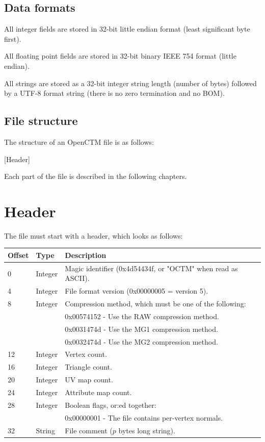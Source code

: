 \section{Data formats}
All integer fields are stored in 32-bit little endian format (least significant
byte first).

All floating point fields are stored in 32-bit binary IEEE 754 format (little
endian).

All strings are stored as a 32-bit integer string length (number of bytes)
followed by a UTF-8 format string (there is no zero termination and no BOM).

\section{File structure}
The structure of an OpenCTM file is as follows:

[Header]

Each part of the file is described in the following chapters.



\chapter{Header}
The file must start with a header, which looks as follows:

\begin{tabular}{|l|l|l|}\hline
\textbf{Offset} &  \textbf{Type} & \textbf{Description}\\ \hline
0 & Integer & Magic identifier (0x4d54434f, or "OCTM" when read as ASCII).\\ \hline
4 & Integer & File format version (0x00000005 = version 5).\\ \hline
8 & Integer & Compression method, which must be one of the following:\\
 & & 0x00574152 - Use the RAW compression method.\\
 & & 0x0031474d - Use the MG1 compression method.\\
 & & 0x0032474d - Use the MG2 compression method.\\ \hline
12 & Integer & Vertex count.\\ \hline
16 & Integer & Triangle count.\\ \hline
20 & Integer & UV map count.\\ \hline
24 & Integer & Attribute map count.\\ \hline
28 & Integer & Boolean flags, or:ed together:\\
 & & 0x00000001 - The file contains per-vertex normals.\\ \hline
32 & String & File comment ($p$ bytes long string).\\ \hline
\end{tabular}

